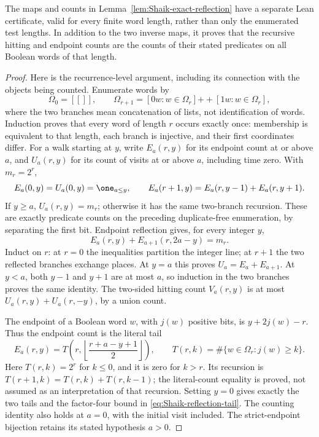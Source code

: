 \begin{proposition}\label{prop:Shaik-reflection-certificate}
The maps and counts in Lemma~\ref{lem:Shaik-exact-reflection} have a
separate Lean certificate, valid for every finite word length, rather
than only the enumerated test lengths. In addition to the two inverse
maps, it proves that the recursive hitting and endpoint counts are
the counts of their stated predicates on all Boolean words of that length.
\end{proposition}
\begin{proof}
Here is the recurrence-level argument, including its connection with
the objects being counted. Enumerate words by
\[
 \Omega_0=[[]],\qquad
 \Omega_{r+1}=[0w:w\in\Omega_r]\mathbin{+\!\!+}[1w:w\in\Omega_r],
\]
where the two branches mean concatenation of lists, not identification
of words. Induction proves that every word of length \(r\) occurs
exactly once: membership is equivalent to that length, each branch
is injective, and their first coordinates differ.
For a walk starting at \(y\), write \(E_a(r,y)\) for its endpoint
count at or above \(a\), and \(U_a(r,y)\) for its count of visits
at or above \(a\), including time zero. With \(m_r=2^r\),
\[
 E_a(0,y)=U_a(0,y)=\one_{a\le y},\qquad
 E_a(r+1,y)=E_a(r,y-1)+E_a(r,y+1).
\]
If \(y\ge a\), \(U_a(r,y)=m_r\); otherwise it has the same two-branch
recursion. These are exactly predicate counts on the preceding
duplicate-free enumeration, by separating the first bit.
Endpoint reflection gives, for every integer \(y\),
\[
 E_a(r,y)+E_{a+1}(r,2a-y)=m_r.
\]
Induct on \(r\): at \(r=0\) the inequalities partition the integer
line; at \(r+1\) the two reflected branches exchange places.
At \(y=a\) this proves \(U_a=E_a+E_{a+1}\). At \(y<a\), both
\(y-1\) and \(y+1\) are at most \(a\), so induction in the two
branches proves the same identity. The two-sided hitting count
\(V_a(r,y)\) is at most \(U_a(r,y)+U_a(r,-y)\), by a union count.

The endpoint of a Boolean word \(w\), with \(j(w)\) positive bits,
is \(y+2j(w)-r\). Thus the endpoint count is the literal tail
\[
 E_a(r,y)=T\!\left(r,\left\lfloor
                    \frac{r+a-y+1}{2}\right\rfloor\right),
 \qquad T(r,k)=\#\{w\in\Omega_r:j(w)\ge k\}.
\]
Here \(T(r,k)=2^r\) for \(k\le0\), and it is zero for \(k>r\).
Its recursion is \(T(r+1,k)=T(r,k)+T(r,k-1)\); the literal-count
equality is proved, not assumed as an interpretation of that recursion.
Setting \(y=0\) gives exactly the two tails and the factor-four bound
in \eqref{eq:Shaik-reflection-tail}. The counting identity also holds
at \(a=0\), with the initial visit included. The strict-endpoint
bijection retains its stated hypothesis \(a>0\).
\end{proof}


